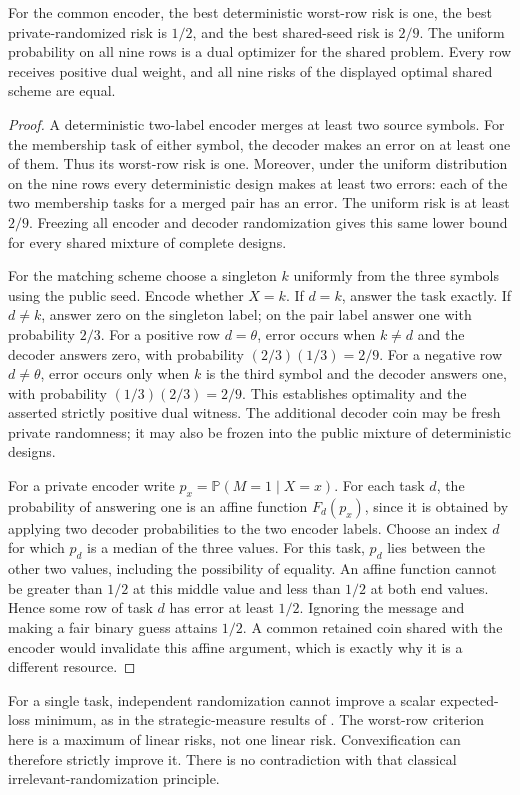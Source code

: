 \begin{theorem}\label{thm:v10-membership}
For the common encoder, the best deterministic worst-row risk is one,
the best private-randomized risk is $1/2$, and the best shared-seed
risk is $2/9$. The uniform probability on all nine rows is a dual
optimizer for the shared problem. Every row receives positive dual
weight, and all nine risks of the displayed optimal shared scheme
are equal.
\end{theorem}
\begin{proof}
A deterministic two-label encoder merges at least two source symbols.
For the membership task of either symbol, the decoder makes an error
on at least one of them. Thus its worst-row risk is one. Moreover,
under the uniform distribution on the nine rows every deterministic
design makes at least two errors: each of the two membership tasks
for a merged pair has an error. The uniform risk is at least $2/9$.
Freezing all encoder and decoder randomization gives this same lower
bound for every shared mixture of complete designs.

For the matching scheme choose a singleton $k$ uniformly from the
three symbols using the public seed. Encode whether $X=k$. If $d=k$,
answer the task exactly. If $d\ne k$, answer zero on the singleton
label; on the pair label answer one with probability $2/3$. For a
positive row $d=\theta$, error occurs when $k\ne d$ and the decoder
answers zero, with probability $(2/3)(1/3)=2/9$. For a negative row
$d\ne\theta$, error occurs only when $k$ is the third symbol and the
decoder answers one, with probability $(1/3)(2/3)=2/9$. This establishes
optimality and the asserted strictly positive dual witness. The
additional decoder coin may be fresh private randomness; it may also
be frozen into the public mixture of deterministic designs.

For a private encoder write $p_x=\mathbb P(M=1\mid X=x)$. For each
task $d$, the probability of answering one is an affine function
$F_d(p_x)$, since it is obtained by applying two decoder probabilities
to the two encoder labels. Choose an index $d$ for which $p_d$ is a median of the three values.
For this task, $p_d$ lies between the other two values,
including the possibility of equality. An affine function cannot be
greater than $1/2$ at this middle value and less than $1/2$ at both
end values. Hence some row of task $d$ has error at least $1/2$.
Ignoring the message and making a fair binary guess attains $1/2$.
A common retained coin shared with the encoder would invalidate this
affine argument, which is exactly why it is a different resource.
\end{proof}

For a single task, independent randomization cannot improve a scalar
expected-loss minimum, as in the strategic-measure results of
\cite{YukselSaldi2017}. The worst-row criterion here is a maximum of
linear risks, not one linear risk. Convexification can therefore
strictly improve it. There is no contradiction with that classical
irrelevant-randomization principle.
